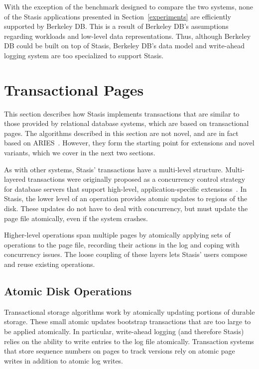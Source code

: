 \documentclass[letterpaper,twocolumn,10pt]{article}
\newcommand{\yad}{Stasis\xspace}
\newcommand{\yads}{Stasis'\xspace}
\begin{document}
With the exception of the benchmark designed to compare the two
systems, none of the \yad applications presented in
Section~\ref{experiments} are efficiently supported by Berkeley DB.
This is a result of Berkeley DB's assumptions regarding workloads and
low-level data representations.  Thus, although
Berkeley DB could be built on top of \yad, Berkeley DB's data model
and write-ahead logging system are too specialized to support \yad.




\section{Transactional Pages}

This section describes how \yad implements transactions that are
similar to those provided by relational database systems, which are
based on transactional pages.  The algorithms described in this
section are not novel, and are in fact based on
ARIES~\cite{aries}.  However, they form the starting point for
extensions and novel variants, which we cover in the next two
sections.

As with other systems, \yads transactions have a multi-level
structure.  Multi-layered transactions were originally proposed as a
concurrency control strategy for database servers that support high-level, application-specific extensions~\cite{multiLayeredSystems}.
In \yad, the lower level of an operation provides atomic updates to regions of
the disk.  These updates do not have to deal with concurrency, but
must update the page file atomically, even if the system crashes.

Higher-level operations span multiple pages by
atomically applying sets of operations to the page file, recording
their actions in the log and coping with concurrency issues.  The
loose coupling of these layers lets \yads users compose and reuse
existing operations.

\subsection{Atomic Disk Operations}

Transactional storage algorithms work by
atomically updating portions of durable storage.  These small atomic
updates bootstrap transactions that are too large to be
applied atomically.  In particular, write-ahead logging (and therefore
\yad) relies on the ability to write entries to the log
file atomically.  Transaction systems that store sequence numbers on pages to 
track versions rely on atomic page writes in addition to atomic log writes. 
\end{document}
